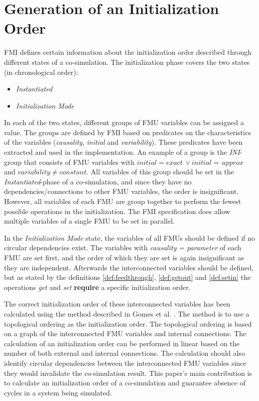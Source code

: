\documentclass[runningheads]{llncs}
\begin{document}
\section{Generation of an Initialization Order}\label{sc:initilization}
FMI defines certain information about the initialization order described through different states of a co-simulation. The initialization phase covers the two states (in chronological order):
\begin{itemize}
    \item \textit{Instantiated}
    \item \textit{Initialization Mode}
\end{itemize}
In each of the two states, different groups of FMU variables can be assigned a value. The groups are defined by FMI based on predicates on the characteristics of the variables (\textit{causality}, \textit{initial} and \textit{variability}). These predicates have been extracted and used in the implementation. 
An example of a group is the \textit{INI}-group that consists of FMU variables with $initial = exact\, \lor initial = \,approx $  and $variability \neq constant$. All variables of this group should be set in the \textit{Instantiated}-phase of a co-simulation, and since they have no dependencies/connections to other FMU variables, the order is insignificant. However, all variables of each FMU are group together to perform the fewest possible operations in the initialization. The FMI specification does allow multiple variables of a single FMU to be set in parallel.

In the \textit{Initialization Mode} state, the variables of all FMUs should be defined if no circular dependencies exist. 
The variables with \textit{causality = parameter} of each FMU are set first, and the order of which they are set is again insignificant as they are independent.
Afterwards the interconnected variables should be defined, but as stated by the definitions \ref{def:feedthrough}, \ref{def:getout} and \ref{def:setin} the operations \textit{get} and \textit{set} \textbf{require} a specific initialization order. 

The correct initialization order of these interconnected variables has been calculated using the method described in Gomes et al. \cite{Gomes2019b}. The method is to use a topological ordering as the initialization order. The topological ordering is based on a graph of the interconnected FMU variables and internal connections. 
The calculation of an initialization order can be performed in linear based on the number of both external and internal connections. The calculation should also identify circular dependencies between the interconnected FMU variables since they would invalidate the co-simulation result. This paper's main contribution is to calculate an initialization order of a co-simulation and guarantee absence of cycles in a system being simulated.
\end{document}
